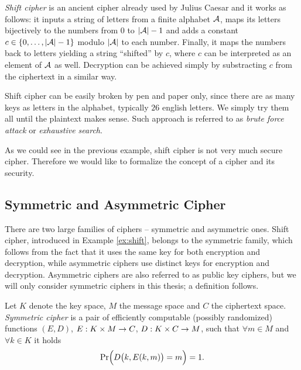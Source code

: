 \begin{example}
\label{ex:shift}
	{\em Shift cipher} is an ancient cipher already used by Julius Caesar and it works as follows: it inputs a string of letters from a finite alphabet $\cal A$, maps its letters bijectively to the numbers from $0$ to $|{\cal A}|-1$ and adds a constant $c\in\{0 , \ldots , |{\cal A}|-1\}$ modulo $|\cal A|$ to each number. Finally, it maps the numbers back to letters yielding a string ``shifted'' by $c$, where $c$ can be interpreted as an element of $\cal A$ as well. Decryption can be achieved simply by substracting $c$ from the ciphertext in a similar way.
	
	Shift cipher can be easily broken by pen and paper only, since there are as many keys as letters in the alphabet, typically $26$ english letters. We simply try them all until the plaintext makes sense. Such approach is referred to as {\em brute force attack} or {\em exhaustive search}.
\end{example}

As we could see in the previous example, shift cipher is not very much secure cipher. Therefore we would like to formalize the concept of a cipher and its security.



\subsection{Symmetric and Asymmetric Cipher}

There are two large families of ciphers -- symmetric and asymmetric ones. Shift cipher, introduced in Example \ref{ex:shift}, belongs to the symmetric family, which follows from the fact that it uses the same key for both encryption and decryption, while asymmetric ciphers use distinct keys for encryption and decryption. Asymmetric ciphers are also referred to as public key ciphers, but we will only consider symmetric ciphers in this thesis; a definition follows.

\begin{defn}
\label{def:symcipher}
	Let $K$ denote the key space, $M$ the message space and $C$ the ciphertext space. {\em Symmetric cipher} is a pair of efficiently computable (possibly randomized) functions $(E,D)$, $E:K\times M\rightarrow C$, $D:K\times C\rightarrow M$, such that $\forall m\in M$ and $\forall k\in K$ it holds   %
	\begin{equation}
	\label{eq:correct}
		\Pr\Bigl(D\bigl(k,E(k,m)\bigr)=m\Bigr) = 1 .
	\end{equation}
\end{defn}


